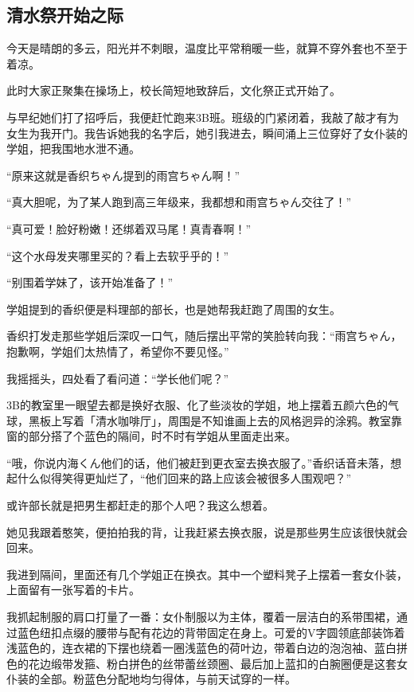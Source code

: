 \subsection{清水祭开始之际}
\newday{\cloudy}

今天是晴朗的多云，阳光并不刺眼，温度比平常稍暖一些，就算不穿外套也不至于着凉。

此时大家正聚集在操场上，校长简短地致辞后，文化祭正式开始了。

与早纪她们打了招呼后，我便赶忙跑来3B班。班级的门紧闭着，我敲了敲才有为女生为我开门。我告诉她我的名字后，她引我进去，瞬间涌上三位穿好了女仆装的学姐，把我围地水泄不通。

“原来这就是香织ちゃん提到的雨宫ちゃん啊！”

“真大胆呢，为了某人跑到高三年级来，我都想和雨宫ちゃん交往了！”

“真可爱！脸好粉嫩！还绑着双马尾！真青春啊！”

“这个水母发夹哪里买的？看上去软乎乎的！”

“别围着学妹了，该开始准备了！”

学姐提到的香织便是料理部的部长，也是她帮我赶跑了周围的女生。

香织打发走那些学姐后深叹一口气，随后摆出平常的笑脸转向我：“雨宫ちゃん，抱歉啊，学姐们太热情了，希望你不要见怪。”

我摇摇头，四处看了看问道：“学长他们呢？”

3B的教室里一眼望去都是换好衣服、化了些淡妆的学姐，地上摆着五颜六色的气球，黑板上写着「清水咖啡厅」，周围是不知谁画上去的风格迥异的涂鸦。教室靠窗的部分搭了个蓝色的隔间，时不时有学姐从里面走出来。

“哦，你说内海くん他们的话，他们被赶到更衣室去换衣服了。”香织话音未落，想起什么似得笑得更灿烂了，“他们回来的路上应该会被很多人围观吧？”

或许部长就是把男生都赶走的那个人吧？我这么想着。

她见我跟着憨笑，便拍拍我的背，让我赶紧去换衣服，说是那些男生应该很快就会回来。

我进到隔间，里面还有几个学姐正在换衣。其中一个塑料凳子上摆着一套女仆装，上面留有一张写着的卡片。

我抓起制服的肩口打量了一番：女仆制服以为主体，覆着一层洁白的系带围裙，通过蓝色纽扣点缀的腰带与配有花边的背带固定在身上。可爱的V字圆领底部装饰着浅蓝色的，连衣裙的下摆也绕着一圈浅蓝色的荷叶边，带着白边的泡泡袖、蓝白拼色的花边缎带发箍、粉白拼色的丝带蕾丝颈圈、最后加上蓝扣的白腕圈便是这套女仆装的全部。粉蓝色分配地均匀得体，与前天试穿的一样。

